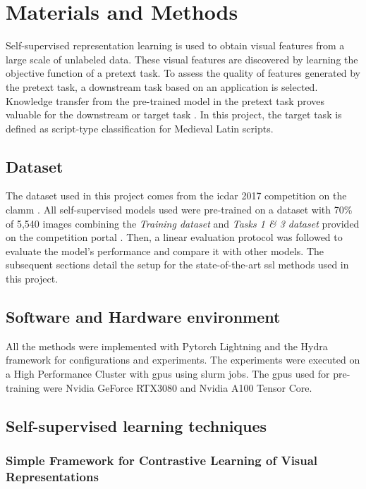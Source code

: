 \chapter{Materials and Methods}
Self-supervised representation learning is used to obtain visual features from a large scale of unlabeled data. These visual features are discovered by learning the objective function of a pretext task. To assess the quality of features generated by the pretext task, a downstream task based on an application is selected. Knowledge transfer from the pre-trained model in the pretext task proves valuable for the downstream or target task \cite{ericsson_self-supervised_2022}. In this project, the target task is defined as script-type classification for Medieval Latin scripts.

\section{Dataset}

The dataset used in this project comes from the \acrfull{icdar} 2017 competition on the \acrfull{clamm} \cite{cloppet_icdar2017_2017}. All self-supervised models used were pre-trained on a dataset with 70\% of 5,540 images combining the \textit{Training dataset} and \textit{Tasks 1 \& 3 dataset} provided on the competition portal \cite{noauthor_icdar2017-clamm_nodate}. Then, a linear evaluation protocol was followed to evaluate the model's performance and compare it with other models. The subsequent sections detail the setup for the state-of-the-art \gls{ssl} methods used in this project.

\section{Software and Hardware environment}

All the methods were implemented with Pytorch Lightning \cite{Falcon2019} and the Hydra framework \cite{Yadan2019Hydra} for configurations and experiments. The experiments were executed on a High Performance Cluster with \glspl{gpu} using \gls{slurm} jobs. The \glspl{gpu} used for pre-training were Nvidia GeForce RTX3080 and Nvidia A100 Tensor Core.

\section{Self-supervised learning techniques}

\subsection{Simple Framework for Contrastive Learning of Visual Representations}

